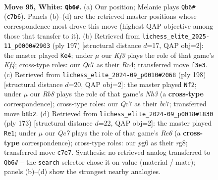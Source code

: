 \documentclass[11pt]{article}
\begin{document}
\clearpage

\begin{figure}[p]\centering
\begin{subfigure}{0.46\textwidth}\centering
\resizebox{\linewidth}{!}{%
\newchessgame
\chessboard[
  setfen={1R6/2Q5/k5p1/5p2/5P2/5K2/8/8 w - - 9 95},
  showmover=false,
  pgfstyle=straightmove, color=movearrow, markmove={c7-b6}
]}
\caption{}
\end{subfigure}\hfill
\begin{subfigure}{0.46\textwidth}\centering
\resizebox{\linewidth}{!}{%
\newchessgame
\chessboard[
  setfen={8/8/8/5k2/r5p1/2K3P1/7P/3R4 b - - 4 99},
  showmover=false,
  pgfstyle=straightmove, color=movearrow, markmove={f5-e4}
]}
\caption{}
\end{subfigure}
\\[4pt]
\begin{subfigure}{0.46\textwidth}\centering
\resizebox{\linewidth}{!}{%
\newchessgame
\chessboard[
  setfen={8/2b5/8/5p2/2k1p3/4P2N/4K3/8 w - - 54 100},
  showmover=false,
  pgfstyle=straightmove, color=movearrow, markmove={h3-f2}
]}
\caption{}
\end{subfigure}\hfill
\begin{subfigure}{0.46\textwidth}\centering
\resizebox{\linewidth}{!}{%
\newchessgame
\chessboard[
  setfen={6R1/8/5k2/5p2/5P1K/4r3/8/8 b - - 6 87},
  showmover=false,
  pgfstyle=straightmove, color=movearrow, markmove={e3-e1}
]}
\caption{}
\end{subfigure}
\caption{\textbf{Move 95, White: \texttt{Qb6\#}.} (a) Our position; Melanie plays \texttt{Qb6\#} (\texttt{c7b6}). Panels (b)--(d) are the retrieved master positions whose correspondence most drove this move (highest QAP objective among those that transfer to it). (b) Retrieved from \texttt{lichess\_elite\_2025-11\_p0000\#2903} (ply 197) [structural distance $d$=17, QAP obj=2]: the master played \texttt{Ke4}; under $\mu$ our \emph{Kf3} plays the role of that game's \emph{Kf4}; cross-type roles: our \emph{Q}c7 as their \emph{R}a4; transferred move \texttt{f3e3}. (c) Retrieved from \texttt{lichess\_elite\_2024-09\_p0010\#2068} (ply 198) [structural distance $d$=20, QAP obj=2]: the master played \texttt{Nf2}; under $\mu$ our \emph{Rb8} plays the role of that game's \emph{Nh3} (a \textbf{cross-type} correspondence); cross-type roles: our \emph{Q}c7 as their \emph{b}c7; transferred move \texttt{b8b2}. (d) Retrieved from \texttt{lichess\_elite\_2024-09\_p0018\#1830} (ply 173) [structural distance $d$=22, QAP obj=2]: the master played \texttt{Re1}; under $\mu$ our \emph{Qc7} plays the role of that game's \emph{Re6} (a \textbf{cross-type} correspondence); cross-type roles: our \emph{p}g6 as their \emph{r}g8; transferred move \texttt{c7e7}. Synthesis: no retrieved analog transferred to \texttt{Qb6\#} -- the \texttt{search} selector chose it on value (material / mate); panels (b)--(d) show the strongest nearby analogies.}
\label{fig:thought-m188}
\end{figure}
\end{document}
